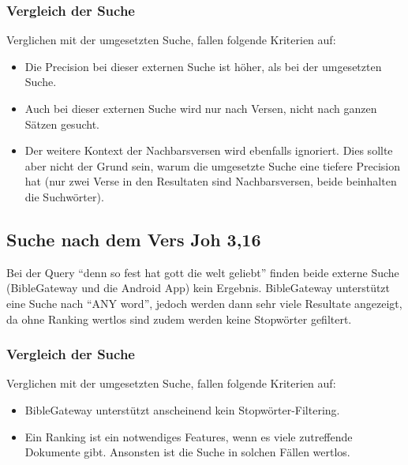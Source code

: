 \subsubsection{Vergleich der Suche}
Verglichen mit der umgesetzten Suche, fallen folgende Kriterien auf:
\begin{itemize}[noitemsep]
	\item Die Precision bei dieser externen Suche ist höher, als bei der umgesetzten Suche.
	\item Auch bei dieser externen Suche wird nur nach Versen, nicht nach ganzen Sätzen gesucht.
	\item Der weitere Kontext der Nachbarsversen wird ebenfalls ignoriert. Dies sollte aber nicht der Grund sein, warum die umgesetzte Suche eine tiefere Precision hat (nur zwei Verse in den Resultaten sind Nachbarsversen, beide beinhalten die Suchwörter).
\end{itemize}



\subsection{Suche nach dem Vers Joh 3,16}
Bei der Query "`denn so fest hat gott die welt geliebt"' finden beide externe Suche (BibleGateway und die Android App) kein Ergebnis.
BibleGateway unterstützt eine Suche nach "`ANY word"', jedoch werden dann sehr viele Resultate angezeigt, da ohne Ranking wertlos sind zudem werden keine Stopwörter gefiltert.

\subsubsection{Vergleich der Suche}
Verglichen mit der umgesetzten Suche, fallen folgende Kriterien auf:
\begin{itemize}[noitemsep]
	\item BibleGateway unterstützt anscheinend kein Stopwörter-Filtering.
	\item Ein Ranking ist ein notwendiges Features, wenn es viele zutreffende Dokumente gibt. Ansonsten ist die Suche in solchen Fällen wertlos.
\end{itemize}

